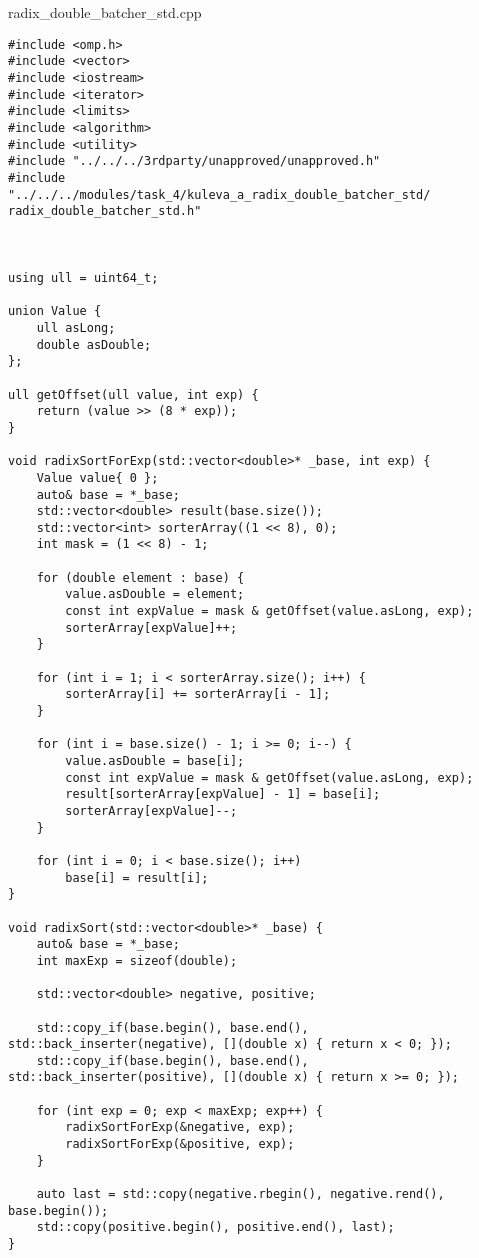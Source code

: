 \documentclass[12pt,a4paper]{article}
\begin{document}
\section{} radix\_double\_batcher\_std.cpp
\begin{lstlisting}
#include <omp.h>
#include <vector>
#include <iostream>
#include <iterator>
#include <limits>
#include <algorithm>
#include <utility>
#include "../../../3rdparty/unapproved/unapproved.h"
#include
"../../../modules/task_4/kuleva_a_radix_double_batcher_std/ radix_double_batcher_std.h"



using ull = uint64_t;

union Value {
    ull asLong;
    double asDouble;
};

ull getOffset(ull value, int exp) {
    return (value >> (8 * exp));
}

void radixSortForExp(std::vector<double>* _base, int exp) {
    Value value{ 0 };
    auto& base = *_base;
    std::vector<double> result(base.size());
    std::vector<int> sorterArray((1 << 8), 0);
    int mask = (1 << 8) - 1;

    for (double element : base) {
        value.asDouble = element;
        const int expValue = mask & getOffset(value.asLong, exp);
        sorterArray[expValue]++;
    }

    for (int i = 1; i < sorterArray.size(); i++) {
        sorterArray[i] += sorterArray[i - 1];
    }

    for (int i = base.size() - 1; i >= 0; i--) {
        value.asDouble = base[i];
        const int expValue = mask & getOffset(value.asLong, exp);
        result[sorterArray[expValue] - 1] = base[i];
        sorterArray[expValue]--;
    }

    for (int i = 0; i < base.size(); i++)
        base[i] = result[i];
}

void radixSort(std::vector<double>* _base) {
    auto& base = *_base;
    int maxExp = sizeof(double);

    std::vector<double> negative, positive;

    std::copy_if(base.begin(), base.end(), std::back_inserter(negative), [](double x) { return x < 0; });
    std::copy_if(base.begin(), base.end(), std::back_inserter(positive), [](double x) { return x >= 0; });

    for (int exp = 0; exp < maxExp; exp++) {
        radixSortForExp(&negative, exp);
        radixSortForExp(&positive, exp);
    }

    auto last = std::copy(negative.rbegin(), negative.rend(), base.begin());
    std::copy(positive.begin(), positive.end(), last);
}


\end{lstlisting}
\end{document}
